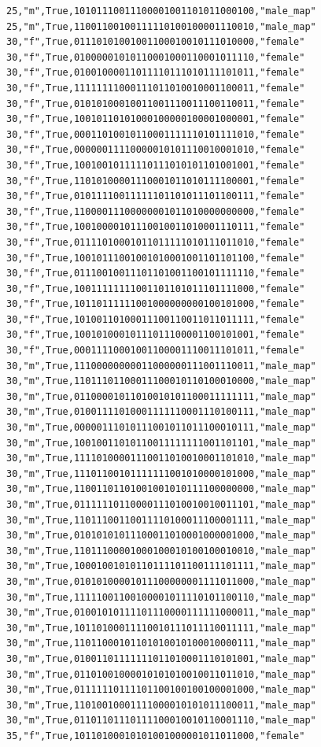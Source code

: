 \documentclass[authoryearcitations]{UoYCSproject}
\begin{document}
\begin{framed}
\begin{verbatim}
25,"m",True,10101110011100001001101011000100,"male_map"
25,"m",True,11001100100111110100100001110010,"male_map"
30,"f",True,01110101001001100010010111010000,"female"
30,"f",True,01000001010110001000110001011110,"female"
30,"f",True,01001000011011110111010111101011,"female"
30,"f",True,11111111000111011010010001100011,"female"
30,"f",True,01010100010011001110011100110011,"female"
30,"f",True,10010110101000100000100001000001,"female"
30,"f",True,00011010010110001111110101111010,"female"
30,"f",True,00000011110000010101110010001010,"female"
30,"f",True,10010010111110111010101101001001,"female"
30,"f",True,11010100001110001011010111100001,"female"
30,"f",True,01011110011111101101011101100111,"female"
30,"f",True,11000011100000001011010000000000,"female"
30,"f",True,10010000101110010011010001110111,"female"
30,"f",True,01111010001011011111010111011010,"female"
30,"f",True,10010111001001010001001101101100,"female"
30,"f",True,01110010011101101001100101111110,"female"
30,"f",True,10011111111001101101011101111000,"female"
30,"f",True,10110111111001000000000100101000,"female"
30,"f",True,10100110100011100110011011011111,"female"
30,"f",True,10010100010111011100001100101001,"female"
30,"f",True,00011110001001100001110011101011,"female"
30,"m",True,11100000000011000000111001110011,"male_map"
30,"m",True,11011101100011100010110100010000,"male_map"
30,"m",True,01100001011010010101100011111111,"male_map"
30,"m",True,01001111010001111110001110100111,"male_map"
30,"m",True,00000111010111001011011100010111,"male_map"
30,"m",True,10010011010110011111111001101101,"male_map"
30,"m",True,11110100001110011010010001101010,"male_map"
30,"m",True,11101100101111111001010000101000,"male_map"
30,"m",True,11001101101001001010111100000000,"male_map"
30,"m",True,01111110110000111010010010011101,"male_map"
30,"m",True,11011100110011110100011100001111,"male_map"
30,"m",True,01010101011100011010001000001000,"male_map"
30,"m",True,11011100001000100010100100010010,"male_map"
30,"m",True,10001001010110111101100111101111,"male_map"
30,"m",True,01010100001011100000001111011000,"male_map"
30,"m",True,11111001100100001011110101100110,"male_map"
30,"m",True,01001010111101110000111111000011,"male_map"
30,"m",True,10110100011110010111011110011111,"male_map"
30,"m",True,11011000101101010010100010000111,"male_map"
30,"m",True,01001101111111011010001110101001,"male_map"
30,"m",True,01101001000010101010010011011010,"male_map"
30,"m",True,01111110111101100100100100001000,"male_map"
30,"m",True,11010010001111000010101011100011,"male_map"
30,"m",True,01101101110111100010010110001110,"male_map"
35,"f",True,10110100010101001000001011011000,"female"

\end{verbatim}
\end{framed}
\end{document}
